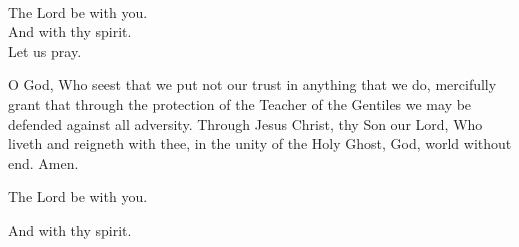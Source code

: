 \\
  \rubric{\Vbar}The Lord be with you.
\\
  \rubric{\Rbar}And with thy spirit.
\\
Let us pray.

O God, Who seest that we put not our trust in anything that we do, mercifully grant that through the protection of the Teacher of the Gentiles we may be defended against all adversity. Through Jesus Christ, thy Son our Lord, Who liveth and reigneth with thee, in the unity of the Holy Ghost, God, world without end.\rubric{\Rbar} Amen.

  \rubric{\Vbar}The Lord be with you.

  \rubric{\Rbar}And with thy spirit.
